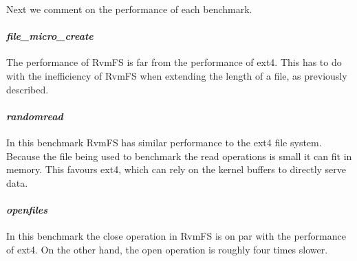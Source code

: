 Next we comment on the performance of each benchmark.

\paragraph{\bf \emph{file\_micro\_create}} The performance of RvmFS is far from
the performance of ext4. This has to do with the inefficiency of RvmFS when
extending the length of a file, as previously described.

\paragraph{\bf \emph{randomread}} In this benchmark RvmFS has similar
performance to the ext4 file system. Because the file being used to benchmark
the read operations is small it can fit in memory. This favours ext4, which can
rely on the kernel buffers to directly serve data.

\paragraph{\bf \emph{openfiles}} In this benchmark the close operation in RvmFS
is on par with the performance of ext4. On the other hand, the open operation
is roughly four times slower.





